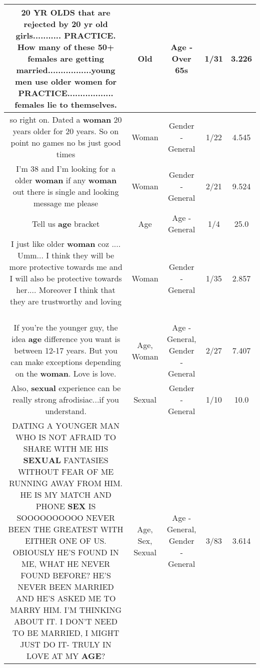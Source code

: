 \documentclass[11pt]{article}
\newlength\mylength
\begin{document}
\begin{center}
\begin{longtable}{|C{.65\mylength}|C{.30\mylength}|C{.12\mylength}|C{.12\mylength}|C{.12\mylength}|}
  \small 20 YR OLDS that are rejected by 20 yr \textbf{old} girls........... PRACTICE.  How many of these 50+ females are getting married.................young men use older women for PRACTICE.................. females lie to themselves.\normalsize   & Old & Age - Over 65s & 1/31 & 3.226 \\  \hline
  \small so right on. Dated a \textbf{woman} 20 years older for 20 years. So on point no games no bs just good times\normalsize   & Woman & Gender - General & 1/22 & 4.545 \\  \hline
  \small I'm 38 and I'm looking for a older \textbf{woman} if any \textbf{woman} out there is single and looking message me please\normalsize   & Woman & Gender - General & 2/21 & 9.524 \\  \hline
  \small Tell us \textbf{age} bracket\normalsize   & Age & Age - General & 1/4 & 25.0 \\  \hline
  \small I just like older \textbf{woman} coz .... Umm... I think they will be more protective towards me and I will also be protective towards her.... Moreover I think that they are trustworthy and loving 🥰\normalsize   & Woman & Gender - General & 1/35 & 2.857 \\  \hline
  \small If you're the younger guy, the idea \textbf{age} difference you want is between 12-17 years. But you can make exceptions depending on the \textbf{woman}. Love is love.\normalsize   & Age, Woman & Age - General, Gender - General & 2/27 & 7.407 \\  \hline
  \small Also, \textbf{sexual} experience can be really strong afrodisiac...if you understand.\normalsize   & Sexual & Gender - General & 1/10 & 10.0 \\  \hline
  \small DATING A YOUNGER MAN WHO IS NOT AFRAID TO SHARE WITH ME HIS \textbf{SEXUAL} FANTASIES WITHOUT FEAR OF ME RUNNING AWAY FROM HIM.  HE IS MY MATCH AND PHONE \textbf{SEX} IS SOOOOOOOOOO NEVER BEEN THE GREATEST WITH EITHER ONE OF US.  OBIOUSLY HE'S FOUND IN ME, WHAT HE NEVER FOUND BEFORE?  HE'S NEVER BEEN MARRIED AND HE'S ASKED ME TO MARRY HIM.  I'M THINKING ABOUT IT.  I DON'T NEED TO BE MARRIED, I MIGHT JUST DO IT- TRULY IN LOVE AT MY \textbf{AGE}?\normalsize   & Age, Sex, Sexual & Age - General, Gender - General & 3/83 & 3.614 \\  \hline

\end{longtable}
\end{center}
\end{document}
